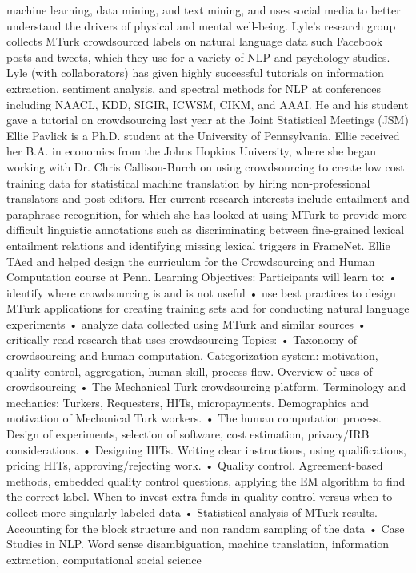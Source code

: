 machine learning, data mining, and text mining, and uses social media to better understand the drivers of physical and mental well-being. Lyle's research group collects MTurk crowdsourced labels on natural language data such Facebook posts and tweets, which they use for a variety of NLP and psychology studies. Lyle (with collaborators) has given highly successful tutorials on information extraction, sentiment analysis, and spectral methods for NLP at conferences including NAACL, KDD, SIGIR, ICWSM, CIKM, and AAAI. He and his student gave a tutorial on crowdsourcing last year at the Joint Statistical Meetings (JSM) Ellie Pavlick is a Ph.D. student at the University of Pennsylvania. Ellie received her B.A. in economics from the Johns Hopkins University, where she began working with Dr. Chris Callison-­Burch on using crowdsourcing to create low­ cost training data for statistical machine translation by hiring non-professional translators and post-editors. Her current research interests include entailment and paraphrase recognition, for which she has looked at using MTurk to provide more difficult linguistic annotations such as discriminating between fine-grained lexical entailment relations and identifying missing lexical triggers in FrameNet. Ellie TAed and helped design the curriculum for the Crowdsourcing and Human Computation course at Penn. Learning Objectives: Participants will learn to: • identify where crowdsourcing is and is not useful • use best practices to design MTurk applications for creating training sets and for conducting natural language experiments • analyze data collected using MTurk and similar sources • critically read research that uses crowdsourcing Topics: • Taxonomy of crowdsourcing and human computation. Categorization system: motivation, quality control, aggregation, human skill, process flow. Overview of uses of crowdsourcing • The Mechanical Turk crowdsourcing platform. Terminology and mechanics: Turkers, Requesters, HITs, micropayments. Demographics and motivation of Mechanical Turk workers. • The human computation process. Design of experiments, selection of software, cost estimation, privacy/IRB considerations. • Designing HITs. Writing clear instructions, using qualifications, pricing HITs, approving/rejecting work. • Quality control. Agreement-­based methods, embedded quality control questions, applying the EM algorithm to find the correct label. When to invest extra funds in quality control versus when to collect more singularly labeled data • Statistical analysis of MTurk results. Accounting for the block structure and non random sampling of the data • Case Studies in NLP. Word sense disambiguation, machine translation, information extraction, computational social science
